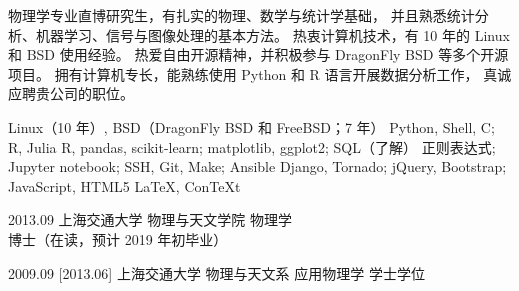 \documentclass[zh]{resume}
\begin{document}
\makeheader

{\onehalfspacing\hspace{1.7em}
物理学专业直博研究生，有扎实的物理、数学与统计学基础，
并且熟悉统计分析、机器学习、信号与图像处理的基本方法。
热衷计算机技术，有 10 年的 Linux 和 BSD 使用经验。
热爱自由开源精神，并积极参与 DragonFly BSD 等多个开源项目。
拥有计算机专长，能熟练使用 Python 和 R 语言开展数据分析工作，
真诚应聘贵公司的\textbf{\getposition}职位。
\par}  %

\begin{competences}
    {Linux（10 年）, BSD（DragonFly BSD 和 FreeBSD；7 年）}
    {Python, Shell, C; R, Julia}
    {R, pandas, scikit-learn; matplotlib, ggplot2; SQL（了解）}
    {正则表达式; Jupyter notebook; SSH, Git, Make; Ansible}
    {Django, Tornado; jQuery, Bootstrap; JavaScript, HTML5}
    {\LaTeX, Con\TeX{}t}
\end{competences}

\begin{educations}
  \education%
    {2013.09}%
    {上海交通大学}%
    {物理与天文学院}%
    {物理学}%
    {博士（在读，预计 2019 年初毕业）}

  \separator{0.7em}
  \education%
    {2009.09}%
    [2013.06]%
    {上海交通大学}%
    {物理与天文系}%
    {应用物理学}%
    {学士学位}
\end{educations}
\end{document}
